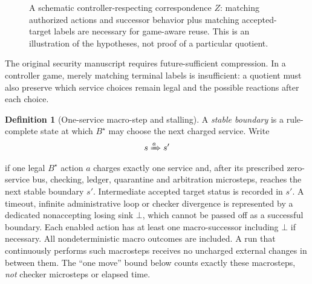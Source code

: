 \documentclass[11pt,letterpaper,oneside]{book}
\theoremstyle{definition}
\newtheorem{definition}[theorem]{Definition}
\theoremstyle{remark}
\begin{document}
\begin{figure}[htbp]
\centering
{}
\caption{A schematic controller-respecting correspondence $Z$: matching authorized actions and successor behavior plus matching accepted-target labels are necessary for game-aware reuse. This is an illustration of the hypotheses, not proof of a particular quotient.}
\label{fig:quotient}
\end{figure}

The original security manuscript requires future-sufficient
compression. In a controller game, merely matching terminal labels
is insufficient: a quotient must also preserve which service choices
remain legal and the possible reactions after each choice.

\begin{definition}[One-service macro-step and stalling]
A \emph{stable boundary} is a rule-complete state at which $B^\star$
may choose the next charged service. Write\[
 s\xRightarrow{a}s'
\]
if one legal $B^\star$ action $a$ charges exactly one service
and, after its prescribed zero-service bus, checking, ledger,
quarantine and arbitration microsteps, reaches the next stable
boundary $s'$. Intermediate accepted target status is recorded in
$s'$. A timeout, infinite administrative loop or checker divergence
is represented by a dedicated nonaccepting losing sink $\bot$,
which cannot be passed off as a successful boundary. Each enabled
action has at least one macro-successor including $\bot$ if
necessary. All nondeterministic macro outcomes are included.
A run that continuously performs such macrosteps receives no uncharged
external changes in between them. The ``one move'' bound below counts
exactly these macrosteps, \emph{not} checker microsteps or elapsed time.
\end{definition}
\end{document}
